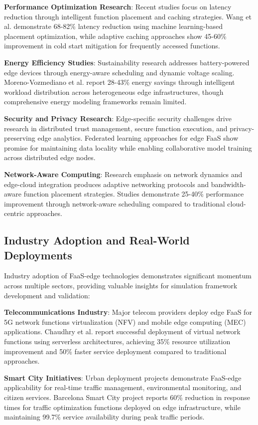 \textbf{Performance Optimization Research}: Recent studies focus on latency reduction through intelligent function placement and caching strategies. Wang et al. \cite{wang2021edgeserve} demonstrate 68-82\% latency reduction using machine learning-based placement optimization, while adaptive caching approaches show 45-60\% improvement in cold start mitigation for frequently accessed functions.

\textbf{Energy Efficiency Studies}: Sustainability research addresses battery-powered edge devices through energy-aware scheduling and dynamic voltage scaling. Moreno-Vozmediano et al. \cite{moreno2023latency} report 28-43\% energy savings through intelligent workload distribution across heterogeneous edge infrastructures, though comprehensive energy modeling frameworks remain limited.

\textbf{Security and Privacy Research}: Edge-specific security challenges drive research in distributed trust management, secure function execution, and privacy-preserving edge analytics. Federated learning approaches for edge FaaS show promise for maintaining data locality while enabling collaborative model training across distributed edge nodes.

\textbf{Network-Aware Computing}: Research emphasis on network dynamics and edge-cloud integration produces adaptive networking protocols and bandwidth-aware function placement strategies. Studies demonstrate 25-40\% performance improvement through network-aware scheduling compared to traditional cloud-centric approaches.

\subsection{Industry Adoption and Real-World Deployments}

Industry adoption of FaaS-edge technologies demonstrates significant momentum across multiple sectors, providing valuable insights for simulation framework development and validation:

\textbf{Telecommunications Industry}: Major telecom providers deploy edge FaaS for 5G network functions virtualization (NFV) and mobile edge computing (MEC) applications. Chaudhry et al. \cite{chaudhry2020improved} report successful deployment of virtual network functions using serverless architectures, achieving 35\% resource utilization improvement and 50\% faster service deployment compared to traditional approaches.

\textbf{Smart City Initiatives}: Urban deployment projects demonstrate FaaS-edge applicability for real-time traffic management, environmental monitoring, and citizen services. Barcelona Smart City project reports 60\% reduction in response times for traffic optimization functions deployed on edge infrastructure, while maintaining 99.7\% service availability during peak traffic periods.

